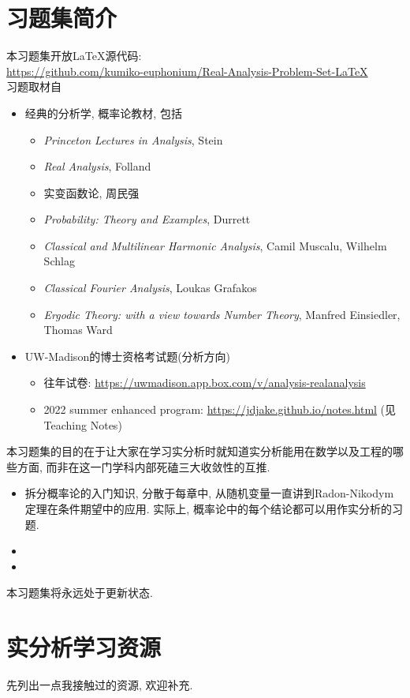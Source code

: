 \section*{习题集简介}
本习题集开放\LaTeX 源代码: \\
\url{https://github.com/kumiko-euphonium/Real-Analysis-Problem-Set-LaTeX} \\
习题取材自
\begin{itemize}
    \item 经典的分析学, 概率论教材, 包括
    \begin{itemize}
        \item \textit{Princeton Lectures in Analysis}, Stein
        \item \textit{Real Analysis}, Folland
        \item 实变函数论, 周民强
        \item \textit{Probability: Theory and Examples}, Durrett
        \item \textit{Classical and Multilinear Harmonic Analysis}, Camil Muscalu, Wilhelm Schlag
        \item \textit{Classical Fourier Analysis}, Loukas Grafakos
        \item \textit{Ergodic Theory: with a view towards Number Theory}, Manfred Einsiedler, Thomas Ward
    \end{itemize}
    \item UW-Madison的博士资格考试题(分析方向)
    \begin{itemize}
        \item 往年试卷: \url{https://uwmadison.app.box.com/v/analysis-realanalysis}
        \item 2022 summer enhanced program: 
        \url{https://jdjake.github.io/notes.html}
        (见Teaching Notes)
    \end{itemize}
\end{itemize}

本习题集的目的在于让大家在学习实分析时就知道实分析能用在数学以及工程的哪些方面, 而非在这一门学科内部死磕三大收敛性的互推.  
\begin{itemize}
    \item 拆分概率论的入门知识, 分散于每章中, 从随机变量一直讲到Radon-Nikodym定理在条件期望中的应用. 实际上, 概率论中的每个结论都可以用作实分析的习题. 
    \item 
    \item 
\end{itemize}
本习题集将永远处于更新状态. 

\section*{实分析学习资源}
先列出一点我接触过的资源, 欢迎补充. 
